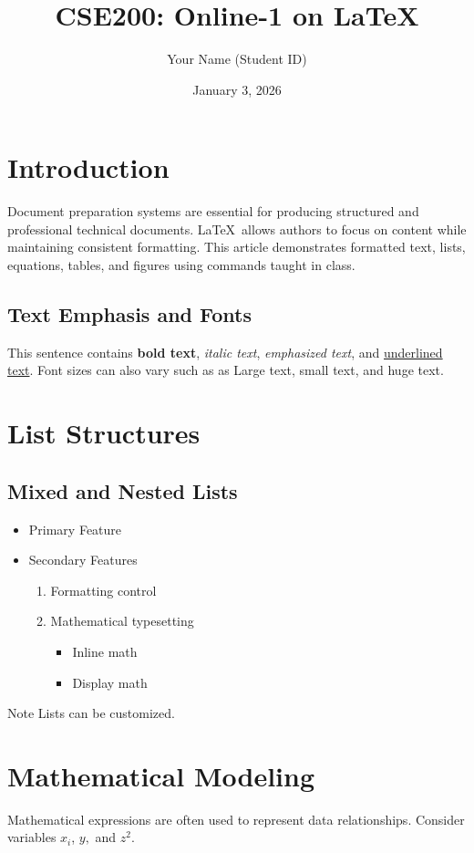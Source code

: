 \documentclass[11pt]{article}
\title{CSE200: Online-1 on \LaTeX}
\author{Your Name (Student ID)}
\date{January 3, 2026}
\begin{document}
\maketitle

\section{Introduction}
Document preparation systems are essential for producing structured and professional technical documents. \LaTeX\ allows authors to focus on content while maintaining consistent formatting. This article demonstrates formatted text, lists, equations, tables, and figures using commands taught in class.

\subsection{Text Emphasis and Fonts}
This sentence contains \textbf{bold text}, \textit{italic text}, \emph{emphasized text}, and \underline{underlined text}. Font sizes can also vary such as as {\Large Large text}, {\small small text}, and {\huge huge text}.

\section{List Structures}

\subsection{Mixed and Nested Lists}
\begin{itemize}
    \item Primary Feature
    \item Secondary Features
    \begin{enumerate}
        \item Formatting control
        \item Mathematical typesetting
        \begin{itemize}
            \item Inline math
            \item Display math
        \end{itemize}
    \end{enumerate}
\end{itemize}

Note Lists can be customized.

\section{Mathematical Modeling}
Mathematical expressions are often used to represent data relationships. Consider variables $x_{i}$, $y,$ and $z^{2}$.
\end{document}
